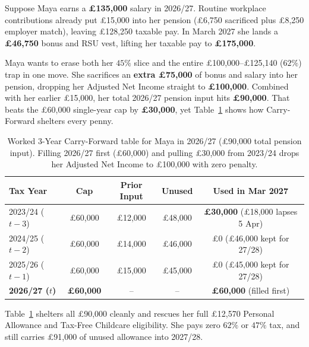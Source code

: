 Suppose Maya earns a \textbf{\pounds 135,000} salary in 2026/27. Routine workplace contributions already put \pounds 15,000 into her pension (\pounds 6,750 sacrificed plus \pounds 8,250 employer match), leaving \pounds 128,250 taxable pay. In March 2027 she lands a \textbf{\pounds 46,750} bonus and RSU vest, lifting her taxable pay to \textbf{\pounds 175,000}.

Maya wants to erase both her $45\%$ slice and the entire \pounds 100,000--\pounds 125,140 ($62\%$) trap in one move. She sacrifices an \textbf{extra \pounds 75,000} of bonus and salary into her pension, dropping her Adjusted Net Income straight to \textbf{\pounds 100,000}. Combined with her earlier \pounds 15,000, her total 2026/27 pension input hits \textbf{\pounds 90,000}. That beats the \pounds 60,000 single-year cap by \textbf{\pounds 30,000}, yet Table~\ref{tab:carry-forward-worked} shows how Carry-Forward shelters every penny.

\begin{table}[ht]
\centering
\small
\setlength{\tabcolsep}{5pt}
\begin{tabular}{lcccc}
\toprule
\textbf{Tax Year} & \textbf{Cap} & \textbf{Prior Input} & \textbf{Unused} & \textbf{Used in Mar 2027} \\
\midrule
2023/24 ($t - 3$) & \pounds 60,000 & \pounds 12,000 & \pounds 48,000 & \textbf{\pounds 30,000} (\pounds 18,000 lapses 5 Apr) \\
2024/25 ($t - 2$) & \pounds 60,000 & \pounds 14,000 & \pounds 46,000 & \pounds 0 (\pounds 46,000 kept for 27/28) \\
2025/26 ($t - 1$) & \pounds 60,000 & \pounds 15,000 & \pounds 45,000 & \pounds 0 (\pounds 45,000 kept for 27/28) \\
\textbf{2026/27 ($t$)} & \textbf{\pounds 60,000} & -- & -- & \textbf{\pounds 60,000} (filled first) \\
\bottomrule
\end{tabular}
\caption{Worked 3-Year Carry-Forward table for Maya in 2026/27 (\pounds 90,000 total pension input). Filling 2026/27 first (\pounds 60,000) and pulling \pounds 30,000 from 2023/24 drops her Adjusted Net Income to \pounds 100,000 with zero penalty.}
\label{tab:carry-forward-worked}
\end{table}

Table~\ref{tab:carry-forward-worked} shelters all \pounds 90,000 cleanly and rescues her full \pounds 12,570 Personal Allowance and Tax-Free Childcare eligibility. She pays zero $62\%$ or $47\%$ tax, and still carries \pounds 91,000 of unused allowance into 2027/28.

